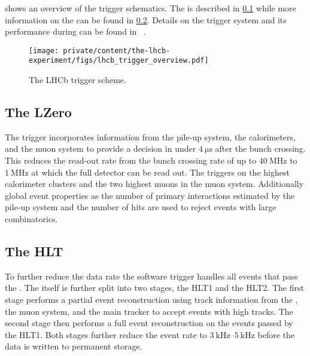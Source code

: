  shows an overview of the \LHCb
trigger schematics. The \LZero is described in
\cref{sec:lhcb_experiment:trigger:lzero} while more information on the \HLT can
be found in \cref{sec:lhcb_experiment:trigger:hlt}. Details on the \LHCb trigger
system and its performance during \RunOne can be found in
\Refs~\cite{Aaij:2012me,Albrecht:2013fba}.
%
\begin{figure}[t]
  \centering
  \texttt{[image: private/content/the-lhcb-experiment/figs/lhcb\_trigger\_overview.pdf]}
  \caption{
    The \acs{LHCb} trigger scheme.
  }
  \label{fig:lhcb_experiment:trigger:overview}
\end{figure}

\subsection{The \acl*{LZero}}
\label{sec:lhcb_experiment:trigger:lzero}

The \LZero trigger incorporates information from the \VELO pile-up system, the
calorimeters, and the muon system to provide a decision in under
$\SI{4}{\micro\second}$ after the bunch crossing. This reduces the read-out rate
from the \LHC bunch crossing rate of up to $\SI{40}{\mega\hertz}$ to
$\SI{1}{\mega\hertz}$ at which the full detector can be read out. The \LZero
triggers on the highest \ET calorimeter clusters and the two highest \pT muons
in the muon system. Additionally global event properties as the number of
primary \protonproton interactions estimated by the \VELO pile-up system and the
number of \SPD hits are used to reject events with large combinatorics.

\newpage
\subsection{The \acl*{HLT}}
\label{sec:lhcb_experiment:trigger:hlt}

To further reduce the data rate the \HLT software trigger handles all events
that pass the \LZero. The \HLT itself is further split into two stages, the
\acs{HLT}1 and the \acs{HLT}2. The first stage performs a partial event
reconstruction using track information from the \VELO, the muon system, and the
main tracker to accept events with high \pT tracks. The second \HLT stage then
performs a full event reconstruction on the events passed by the \acs{HLT}1.
Both \HLT stages further reduce the event rate to $\SIrange[range-units =
single, range-phrase = -]{3}{5}{\kilo\hertz}$ before the data is written to
permanent storage.

